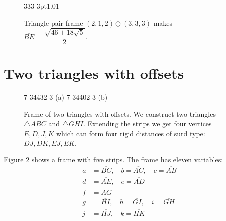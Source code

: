 \documentclass[11pt]{article}
\begin{document}
\begin{figure}[H]
\centering
\begin{center}
 {3}{3}{3} {3pt}{1.0}{1} %
\end{center}
\caption{Triangle pair frame $(2,1,2) \oplus (3,3,3)$ makes $\overline{BE} = \dfrac{\sqrt{46+18\sqrt{5}}}{2}$.}
\label{fig:tripair212333}
\end{figure}







\section{Two triangles with offsets}

\begin{figure}[H]
\centering
\begin{center}
 {7} {3}{4}{4}{3}{2} {3} (a)
 {7} {3}{4}{4}{0}{2} {3} (b)
\end{center}
\caption{Frame of two triangles with offsets. We construct two triangles $\triangle{ABC}$ and
$\triangle{GHI}$. Extending the strips we get four vertices $E,D,J,K$ which
can form four rigid distances of surd type: $\overline{DJ}, \overline{DK},
\overline{EJ}, \overline{EK}$.}
\label{fig:5strips}
\end{figure}

Figure \ref{fig:5strips} shows a frame with five strips. The frame has eleven variables:
\begin{align}
a &= \overline{BC}, \quad b = \overline{AC}, \quad c = \overline{AB}\\
d &= \overline{AE}, \quad e = \overline{AD}\\
f &= \overline{AG}\\
g &= \overline{HI}, \quad h = \overline{GI}, \quad i = \overline{GH}\\
j &= \overline{HJ}, \quad k = \overline{HK}
\end{align}
\end{document}
